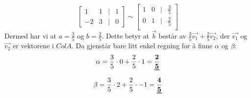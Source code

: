 \documentclass[12pt,norsk,a4paper]{article}
\begin{document}
\begin{equation*}
\begin{bmatrix}
1&1&|&1\\
-2 & 3&|& 0
\end{bmatrix}
\sim
\begin{bmatrix}
1&0&|& \frac{3}{5}\\ 
0&1&|& \frac{2}{5}\\ 
\end{bmatrix}
\end{equation*}
Dermed har vi at $a = \frac{3}{5} $ og $b = \frac{2}{5}$. Dette betyr at $\vec{b}$ består av $\frac{3}{5} \vec{v_1} + \frac{2}{5}\vec{v_2}$, der $\vec{v_1}$ og $\vec{v_2}$ er vektorene i $Col A$.
Da gjenstår bare litt enkel regning for å finne $\alpha $ og $ \beta$:
\begin{equation*}
\alpha = \frac{3}{5} \cdot 0 + \frac{2}{5} \cdot 1 = \mathbf{\uuline{\frac{2}{5}}}
\end{equation*}
\begin{equation*}
\beta = \frac{3}{5} \cdot 2 + \frac{2}{5} \cdot -1 = \mathbf{\uuline{\frac{4}{5}}}
\end{equation*}
\end{document}
